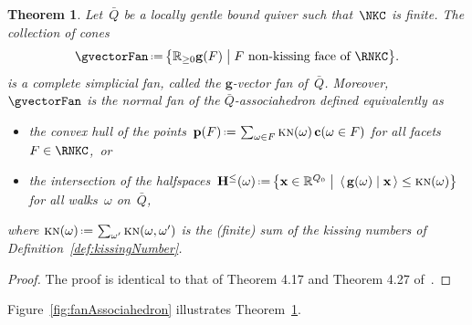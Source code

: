 \documentclass{amsart}
\newtheorem{theorem}{Theorem}[section]
\theoremstyle{definition}
\newcommand{\R}{\mathbb{R}} %
\renewcommand{\b}[1]{\mathbf{#1}} %
\newcommand{\bigset}[2]{\big\{ #1 \;\big|\; #2 \big\}} %
\newcommand{\dotprod}[2]{\left\langle \, #1 \; \middle| \; #2 \, \right\rangle} %
\newcommand{\eqdef}{\mbox{\,\raisebox{0.2ex}{\scriptsize\ensuremath{\mathrm:}}\ensuremath{=}\,}} %
\newcommand{\fref}[1]{Figure~\ref{#1}} %
\newcommand{\darkblue}{\color{darkblue}} %
\newcommand{\defn}[1]{\textsl{\darkblue #1}} %
\newcommand{\KN}{\textsc{kn}} %
\newcommand{\gvector}[1]{\mathbf{g}(#1)} %
\newcommand{\gvectors}[1]{\mathbf{g}(#1)} %
\newcommand{\cvector}[2]{\mathbf{c}(#1 \in #2)} %
\newcommand{\point}[1]{\mathbf{p}(#1)} %
\newcommand{\HS}[1]{\mathbf{H}^{\le}(#1)} %
\begin{document}
\begin{theorem}
\label{thm:fanAssociahedron}
Let~$\bar Q$ be a locally gentle bound quiver such that~$\NKC$ is finite. The collection of cones
\[
\gvectorFan \eqdef \bigset{\R_{\ge0} \gvectors{F}}{F \text{ non-kissing face of } \RNKC}.
\]
is a complete simplicial fan, called the \defn{$\b{g}$-vector fan} of~$\bar Q$.
Moreover, $\gvectorFan$ is the normal fan of the \defn{$\bar Q$-associahedron} defined equivalently as
\begin{itemize}
\item the convex hull of the points~$\point{F} \eqdef \sum_{\omega \in F} \KN(\omega) \, \cvector{\omega}{F}$ for all facets~${F \in \RNKC}$,~or
\item the intersection of the halfspaces~$\HS{\omega} \eqdef \bigset{\b{x} \in \R^{Q_0}}{\dotprod{\gvector{\omega}}{\b{x}} \le \KN(\omega)}$ for all walks~$\omega$ on~$\bar Q$,
\end{itemize}
where $\KN(\omega) \eqdef \sum_{\omega'} \KN(\omega,\omega')$ is the (finite) sum of the kissing numbers of Definition~\ref{def:kissingNumber}.
\end{theorem}

\begin{proof}
The proof is identical to that of Theorem 4.17 and Theorem 4.27 of~\cite{PaluPilaudPlamondon}.
\end{proof}

\fref{fig:fanAssociahedron} illustrates Theorem~\ref{thm:fanAssociahedron}.
\end{document}
